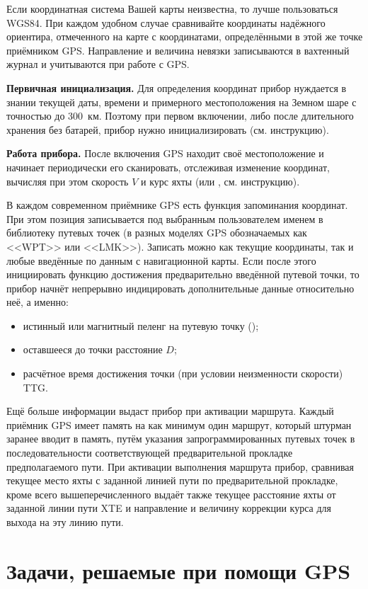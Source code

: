 Если координатная система Вашей карты неизвестна, то лучше пользоваться WGS84. При каждом удобном случае сравнивайте координаты надёжного ориентира, отмеченного на карте с координатами, определёнными в этой же точке приёмником GPS. Направление и величина невязки записываются в вахтенный журнал и учитываются при работе с GPS. 

\textbf{Первичная инициализация.} Для определения координат прибор нуждается в знании текущей даты, времени и примерного местоположения на Земном шаре с точностью до 300~км. Поэтому при первом включении, либо после длительного хранения без батарей, прибор нужно инициализировать (см. инструкцию). 

\textbf{Работа прибора.} После включения GPS находит своё местоположение и начинает периодически его сканировать, отслеживая изменение координат, вычисляя при этом скорость $V$ и курс яхты \IK (или \MK, см. инструкцию). 

В каждом современном приёмнике GPS есть функция запоминания координат. При этом позиция записывается под выбранным пользователем именем в библиотеку путевых точек (в разных моделях GPS обозначаемых как <<WPT>> или <<LMK>>). Записать можно как текущие координаты, так и любые введённые по данным с навигационной карты. Если после этого инициировать функцию достижения предварительно введённой путевой точки, то прибор начнёт непрерывно индицировать дополнительные данные относительно неё, а именно: 

\begin{itemize}
\item истинный или магнитный пеленг на путевую точку \IP (\MP); 
\item оставшееся до точки расстояние $D$; 
\item расчётное время достижения точки (при условии неизменности скорости) TTG.
\end{itemize} 

Ещё больше информации выдаст прибор при активации маршрута. Каждый приёмник GPS имеет память на как минимум один маршрут, который штурман заранее вводит в память, путём указания запрограммированных путевых точек в последовательности соответствующей предварительной прокладке предполагаемого пути. При активации выполнения маршрута прибор, сравнивая текущее место яхты с заданной линией пути по предварительной прокладке, кроме всего вышеперечисленного выдаёт также текущее расстояние яхты от заданной линии пути XTE и направление и величину коррекции курса для выхода на эту линию пути. 

\section{Задачи, решаемые при помощи GPS}


